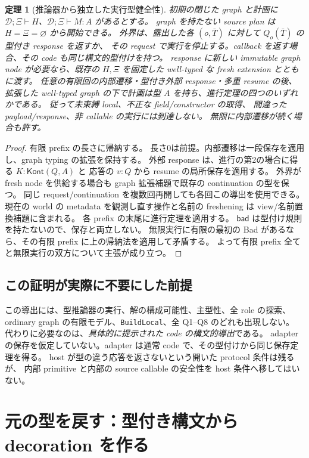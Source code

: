 \documentclass[11pt,a4paper]{article}
\newtheorem{theorem}[definition]{定理}
\newcommand{\Bad}{\mathsf{bad}}
\newcommand{\D}{\mathcal D}
\newcommand{\ty}{\mathrel{\vdash}}
\begin{document}
\begin{theorem}[推論器から独立した実行型健全性]
\label{thm:safety}
初期の閉じた graph と計画に \(\D;\Xi\ty H\)、\(\D;\Xi\ty M:A\) があるとする。
graph を持たない source plan は \(H=\Xi=\varnothing\) から開始できる。
外界は、露出した各 \((o,\bar T)\) に対して \(Q_o(\bar T)\) の型付き response を返すか、
その request で実行を停止する。callback を返す場合、その code も同じ構文的型付けを持つ。
response に新しい immutable graph node が必要なら、既存の \(H,\Xi\) を固定した
well-typed な fresh extension とともに渡す。
任意の有限回の内部遷移・型付き外部 response・多重 resume の後、
拡張した well-typed graph の下で計画は型 \(A\) を持ち、進行定理の四つのいずれかである。
従って未束縛 local、不正な field/constructor の取得、
間違った payload/response、非 callable の実行には到達しない。
無限に内部遷移が続く場合も許す。
\end{theorem}
\begin{proof}
有限 prefix の長さに帰納する。
長さ0は前提。内部遷移は一段保存を適用し、graph typing の拡張を保持する。
外部 response は、進行の第2の場合に得る \(K:\mathsf{Kont}(Q,A)\) と
応答の \(v:Q\) から resume の局所保存を適用する。
外界が fresh node を供給する場合も graph 拡張補題で既存の continuation の型を保つ。
同じ request/continuation を複数回再開しても各回この導出を使用できる。
現在の world の metadata を観測し直す操作と名前の freshening は view/名前置換補題に含まれる。
各 prefix の末尾に進行定理を適用する。
\(\Bad\) は型付け規則を持たないので、保存と両立しない。
無限実行に有限の最初の Bad があるなら、その有限 prefix に上の帰納法を適用して矛盾する。
よって有限 prefix 全てと無限実行の双方について主張が成り立つ。
\end{proof}

\subsection{この証明が実際に不要にした前提}

この導出には、型推論器の実行、解の構成可能性、主型性、全 role の探索、
ordinary graph の有限モデル、\texttt{BuildLocal}、全 Q1--Q8 のどれも出現しない。
代わりに必要なのは、\emph{具体的に提示された code の構文的導出}である。
adapter の保存を仮定していない。adapter は通常 code で、その型付けから同じ保存定理を得る。
host が型の違う応答を返さないという開いた protocol 条件は残るが、
内部 primitive と内部の source callable の安全性を host 条件へ移してはいない。

\section{元の型を戻す：型付き構文から decoration を作る}
\label{sec:decoration}
\end{document}
